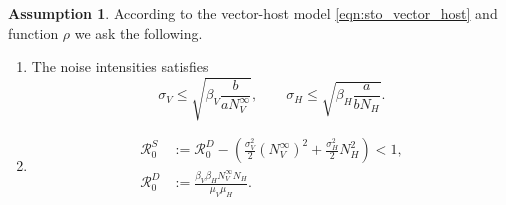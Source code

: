 \documentclass{amsart}
\theoremstyle{plain}
\theoremstyle{definition}
\newtheorem{assumption}{Assumption}
\begin{document}
   
 \begin{assumption}\label{ass:extintion}
        According to the vector-host model \eqref{eqn:sto_vector_host} and function
        $\rho$
        we ask the following.
        \begin{enumerate}[(E-1)]
            \item \label{ass:noise_condition}
                The noise intensities satisfies
                $$
                    \sigma_V \leq 
                        \sqrt{\beta_V \frac{b}{a N_V^{\infty}}},
                     \qquad
                    \sigma_H \leq
                        \sqrt{\beta_H \frac{a}{b N_H}}.
                $$
            \item
                \begin{equation*}
                    \begin{aligned}
                        \mathcal{R}_0 ^ S &:=
                            \mathcal{R}_0^D - 
                            \left( 
                                \frac{\sigma_V ^ 2}{2} (N_V ^ {\infty}) ^ 2
                                +
                                \frac{\sigma_H ^ 2}{2} N_H ^ 2
                            \right)
                            <1,
                            \\
                        \mathcal{R}_0 ^ D &:=
                                \frac{\beta_V \beta_H N_V ^ \infty N_H}{\mu_V \mu_H} .
                    \end{aligned}
                \end{equation*}
        \end{enumerate}
    \end{assumption}
%
\end{document}
